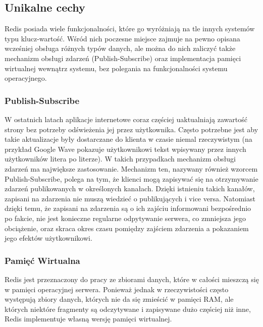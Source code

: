 \subsection*{Unikalne cechy}

Redis posiada wiele funkcjonalności, które go wyróżniają na tle innych systemów typu klucz-wartość.
Wśród nich poczesne miejsce zajmuje na pewno opisana wcześniej obsługa różnych typów danych, ale można do nich zaliczyć także mechanizm obsługi zdarzeń (Publish-Subscribe) oraz implementacja pamięci wirtualnej wewnątrz systemu, bez polegania na funkcjonalności systemu operacyjnego.

\subsubsection*{Publish-Subscribe}

W ostatnich latach aplikacje internetowe coraz częściej uaktualniają zawartość strony bez potrzeby odświeżenia jej przez użytkownika.
Często potrzebne jest aby takie aktualizacje były dostarczane do klienta w czasie niemal rzeczywistym (na przykład Google Wave pokazuje użytkownikowi tekst wpisywany przez innych użytkowników litera po literze).
W takich przypadkach mechanizm obsługi zdarzeń ma największe zastosowanie.
Mechanizm ten, nazywany również wzorcem Publish-Subscribe, polega na tym, że klienci mogą zapisywać się na otrzymywanie zdarzeń publikowanych w określonych kanałach.
Dzięki istnieniu takich kanałów, zapisani na zdarzenia nie muszą wiedzieć o publikujących i vice versa.
Natomiast dzięki temu, że zapisani na zdarzenia są o ich zajściu informowani bezpośrednio po fakcie, nie jest konieczne regularne odpytywanie serwera, co zmniejsza jego obciążenie, oraz skraca okres czasu pomiędzy zajściem zdarzenia a pokazaniem jego efektów użytkownikowi.

\subsubsection*{Pamięć Wirtualna}

Redis jest przeznaczony do pracy ze zbiorami danych, które w całości mieszczą się w pamięci operacyjnej serwera.
Ponieważ jednak w rzeczywistości często występują zbiory danych, których nie da się zmieścić w pamięci RAM, ale których niektóre fragmenty są odczytywane i zapisywane dużo częściej niż inne, Redis implementuje własną wersję pamięci wirtualnej.

